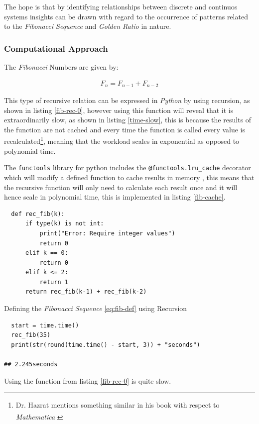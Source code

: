 \documentclass[11pt]{article}
\begin{document}
The hope is that by identifying relationships between discrete and continuos systems insights can be drawn with regard to the occurrence of patterns related to the \emph{Fibonacci Sequence} and \emph{Golden Ratio} in nature.

\subsubsection{Computational Approach}
\label{define-the-fibonacci-numbers}
The \emph{Fibonacci} Numbers are given by:

\begin{align}
F_n = F_{n-1} + F_{n-2} \label{eq:fib-def}
\end{align}

This type of recursive relation can be expressed in \emph{Python} by using recursion,
as shown in listing \ref{fib-rec-0}, however using this function will reveal that it
is extraordinarily slow, as shown in listing \ref{time-slow}, this is because the
results of the function are not cached and every time the function is called
every value is recalculated\footnote{Dr. Hazrat mentions something similar in his book with respect to
\emph{Mathematica}\textsuperscript{\textregistered}
\cite[Ch. 13]{hazratMathematicaProblemCenteredApproach2015}}, meaning that the workload scales in
exponential as opposed to polynomial time.

The \texttt{functools} library for python includes the \texttt{@functools.lru\_cache} decorator
which will modify a defined function to cache results in memory
\cite{FunctoolsHigherorderFunctions}, this means that the recursive function will
only need to calculate each result once and it will hence scale in polynomial
time, this is implemented in listing \ref{fib-cache}.


\begin{listing}[htbp]
\begin{verbatim}
  def rec_fib(k):
      if type(k) is not int:
          print("Error: Require integer values")
          return 0
      elif k == 0:
          return 0
      elif k <= 2:
          return 1
      return rec_fib(k-1) + rec_fib(k-2)
\end{verbatim}
\caption{\label{fib-rec-0}Defining the \emph{Fibonacci Sequence} \eqref{eq:fib-def} using Recursion}
\end{listing}

\begin{listing}[htbp]
\begin{verbatim}
  start = time.time()
  rec_fib(35)
  print(str(round(time.time() - start, 3)) + "seconds")

## 2.245seconds
\end{verbatim}
\caption{\label{time-slow}Using the function from listing \ref{fib-rec-0} is quite slow.}
\end{listing}
\end{document}
